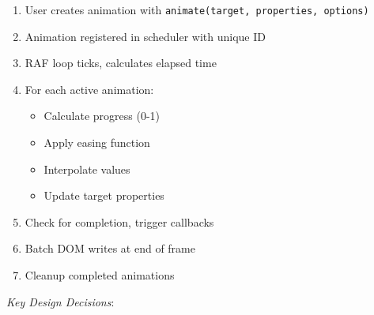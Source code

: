 \documentclass[11pt]{article}
\begin{document}
\begin{enumerate}
\item User creates animation with \texttt{animate(target, properties, options)}
\item Animation registered in scheduler with unique ID
\item RAF loop ticks, calculates elapsed time
\item For each active animation:
\begin{itemize}
\item Calculate progress (0-1)
\item Apply easing function
\item Interpolate values
\item Update target properties
\end{itemize}
\item Check for completion, trigger callbacks
\item Batch DOM writes at end of frame
\item Cleanup completed animations
\end{enumerate}

\emph{Key Design Decisions}:
\end{document}
